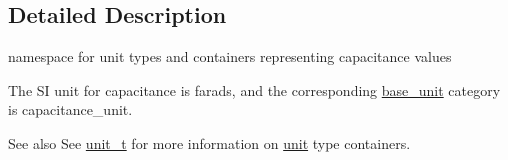 \subsection{Detailed Description}
namespace for unit types and containers representing capacitance values 

The S\+I unit for capacitance is {\ttfamily farads}, and the corresponding {\ttfamily \hyperlink{structunits_1_1base__unit}{base\+\_\+unit}} category is {\ttfamily capacitance\+\_\+unit}. \begin{DoxySeeAlso}{See also}
See \hyperlink{classunits_1_1unit__t}{unit\+\_\+t} for more information on \hyperlink{structunits_1_1unit}{unit} type containers. 
\end{DoxySeeAlso}
